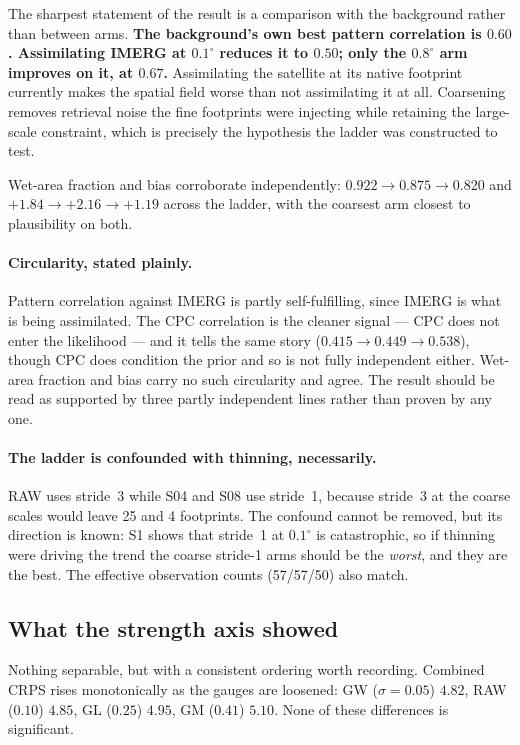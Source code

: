 The sharpest statement of the result is a comparison with the background rather
than between arms. \textbf{The background's own best pattern correlation is
$0.60$. Assimilating IMERG at $0.1^\circ$ reduces it to $0.50$; only the
$0.8^\circ$ arm improves on it, at $0.67$.} Assimilating the satellite at its
native footprint currently makes the spatial field worse than not assimilating
it at all. Coarsening removes retrieval noise the fine footprints were
injecting while retaining the large-scale constraint, which is precisely the
hypothesis the ladder was constructed to test.

Wet-area fraction and bias corroborate independently: $0.922 \rightarrow 0.875
\rightarrow 0.820$ and $+1.84 \rightarrow +2.16 \rightarrow +1.19$ across the
ladder, with the coarsest arm closest to plausibility on both.

\paragraph{Circularity, stated plainly.}
Pattern correlation against IMERG is partly self-fulfilling, since IMERG is
what is being assimilated. The CPC correlation is the cleaner signal --- CPC
does not enter the likelihood --- and it tells the same story ($0.415
\rightarrow 0.449 \rightarrow 0.538$), though CPC does condition the prior and
so is not fully independent either. Wet-area fraction and bias carry no such
circularity and agree. The result should be read as supported by three partly
independent lines rather than proven by any one.

\paragraph{The ladder is confounded with thinning, necessarily.}
RAW uses stride~3 while S04 and S08 use stride~1, because stride~3 at the
coarse scales would leave 25 and 4 footprints. The confound cannot be removed,
but its direction is known: S1 shows that stride~1 at $0.1^\circ$ is
catastrophic, so if thinning were driving the trend the coarse stride-1 arms
should be the \emph{worst}, and they are the best. The effective observation
counts (57/57/50) also match.

\subsection{What the strength axis showed}

Nothing separable, but with a consistent ordering worth recording. Combined
CRPS rises monotonically as the gauges are loosened: GW ($\sigma = 0.05$)
$4.82$, RAW ($0.10$) $4.85$, GL ($0.25$) $4.95$, GM ($0.41$) $5.10$. None of
these differences is significant.


